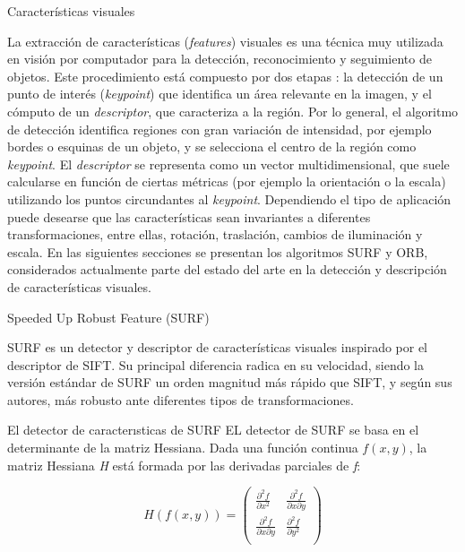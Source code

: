 \begin{section}{Características visuales}
\label{sec:features}

La extracción de características (\textit{features}) visuales es una técnica muy utilizada en visión por computador para la detección, reconocimiento y seguimiento de objetos. Este procedimiento está compuesto por dos etapas : la detección de un punto de interés (\textit{keypoint}) que identifica un área relevante en la imagen, y el cómputo de un \textit{descriptor}, que caracteriza a la región. Por lo general, el algoritmo de detección identifica regiones con gran variación de intensidad, por ejemplo bordes o esquinas de un objeto, y se selecciona el centro de la región como \textit{keypoint}. El \textit{descriptor} se representa como un vector multidimensional, que suele calcularse en función de ciertas métricas (por ejemplo la orientación o la escala) utilizando los puntos circundantes al \textit{keypoint}. Dependiendo el tipo de aplicación puede desearse que las características sean invariantes a diferentes transformaciones, entre ellas, rotación, traslación, cambios de iluminación y escala. En las siguientes secciones se presentan los algoritmos SURF y ORB, considerados actualmente parte del estado del arte en la detección y descripción de características visuales.

\begin{subsection}
{Speeded Up Robust Feature (SURF)}

SURF\cite{bay2008speeded} es un detector y descriptor de características visuales inspirado por el descriptor de SIFT\cite{Lowe04}. Su principal diferencia radica en su velocidad, siendo la versión estándar de SURF un orden magnitud más rápido que SIFT, y según sus autores, más robusto ante diferentes tipos de transformaciones.

\begin{subsection}
{El detector de caracterısticas de SURF}
EL detector de SURF se basa en el determinante de la matriz Hessiana. Dada una función continua $ f(x, y) $, la matriz Hessiana \textit{H} está formada por las derivadas parciales de \textit{f}:

\begin{equation}
H(f(x, y)) =
\left(
\begin{array}{cc}
\frac{\partial^2 f}{\partial x^2} & \frac{\partial^2 f}{{\partial x}{\partial y}} \\
\frac{\partial^2 f}{{\partial x}{\partial y}} & \frac{\partial^2 f}{\partial y^2} \\
\end{array}
\right)
\end{equation}


\end{subsection}
\end{subsection}
\end{section}
